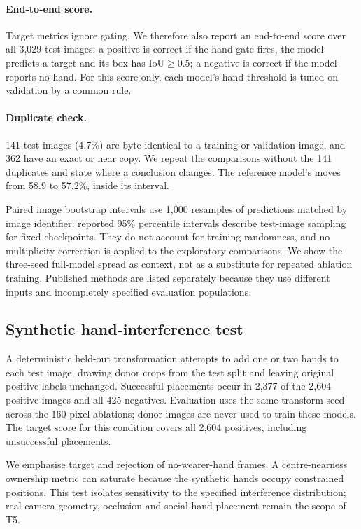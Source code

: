 \paragraph{End-to-end score.}
Target metrics ignore gating. We therefore also report an end-to-end score over all 3,029 test images: a positive is correct if the hand gate fires, the model predicts a target and its box has IoU${}\geq0.5$; a negative is correct if the model reports no hand. For this score only, each model's hand threshold is tuned on validation by a common rule.

\paragraph{Duplicate check.}
141 test images (4.7\%) are byte-identical to a training or validation image, and 362 have an exact or near copy. We repeat the comparisons without the 141 duplicates and state where a conclusion changes. The reference model's  moves from 58.9 to 57.2\%, inside its interval.

Paired image bootstrap intervals use 1,000 resamples of predictions matched by image identifier; reported 95\% percentile intervals describe test-image sampling for fixed checkpoints. They do not account for training randomness, and no multiplicity correction is applied to the exploratory comparisons. We show the three-seed full-model spread as context, not as a substitute for repeated ablation training. Published methods are listed separately because they use different inputs and incompletely specified evaluation populations.

\subsection{Synthetic hand-interference test}
A deterministic held-out transformation attempts to add one or two hands to each test image, drawing donor crops from the test split and leaving original positive labels unchanged. Successful placements occur in 2,377 of the 2,604 positive images and all 425 negatives. Evaluation uses the same transform seed across the 160-pixel ablations; donor images are never used to train these models. The target score for this condition covers all 2,604 positives, including unsuccessful placements.

We emphasise target  and rejection of no-wearer-hand frames. A centre-nearness ownership metric can saturate because the synthetic hands occupy constrained positions. This test isolates sensitivity to the specified interference distribution; real camera geometry, occlusion and social hand placement remain the scope of T5.
